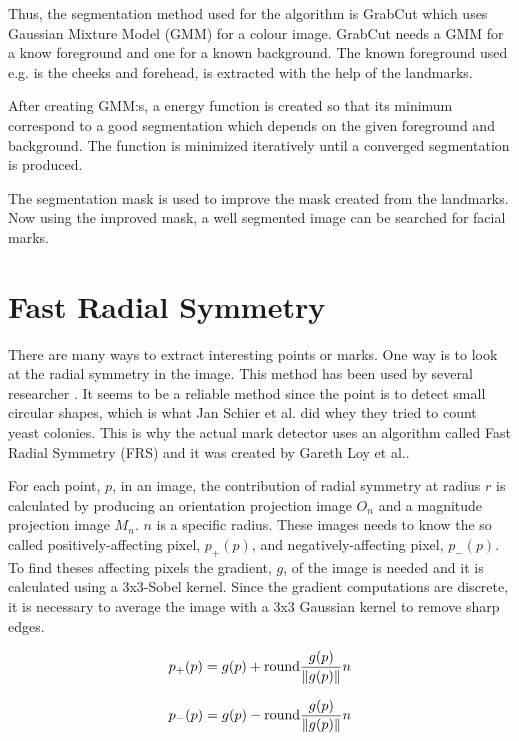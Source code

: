 Thus, the segmentation method used for the algorithm is GrabCut which uses Gaussian Mixture Model (GMM) for a colour image. GrabCut needs a GMM for a know foreground and one for a known background. The known foreground used e.g. is the cheeks and forehead, is extracted with the help of the landmarks. 

After creating GMM:s, a energy function is created so that its minimum correspond to a good segmentation which depends on the given foreground and background. The function is minimized iteratively until a converged segmentation is produced.

The segmentation mask is used to improve the mask created from the landmarks. Now using the improved mask, a well segmented image can be searched for facial marks. 

\section{Fast Radial Symmetry}

There are many ways to extract interesting points or marks. One way is to look at the radial symmetry in the image. This method has been used by several researcher \cite{twins,FRS,automatic_detector_2015,yeast}. It seems to be a reliable method since the point is to detect small circular shapes, which is what Jan Schier et al.\cite{yeast} did whey they tried to count yeast colonies. This is why the actual mark detector uses an algorithm called Fast Radial Symmetry (FRS) and it was created by Gareth Loy et al.\cite{FRS}. 

For each point, $p$, in an image, the contribution of radial symmetry at radius $r$ is calculated by producing an orientation projection image $O_n$ and a magnitude projection image $M_n$. $n$ is a specific radius. These images needs to know the so called positively-affecting pixel, $p_{+}(p)$, and negatively-affecting pixel, $p_{-}(p)$. To find theses affecting pixels the gradient, $g$, of the image is needed and it is calculated using a 3x3-Sobel kernel. Since the gradient computations are discrete, it is necessary to average the image with a 3x3 Gaussian kernel to remove sharp edges. 

\begin{equation} \label{eq:p+}
p_{+}(p) = g(p) + \text{round}\frac{g(p)}{\lVert g(p)\rVert}n
\end{equation}

\begin{equation} \label{eq:p-}
p_{-}(p) = g(p) - \text{round}\frac{g(p)}{\lVert g(p)\rVert}n
\end{equation}

